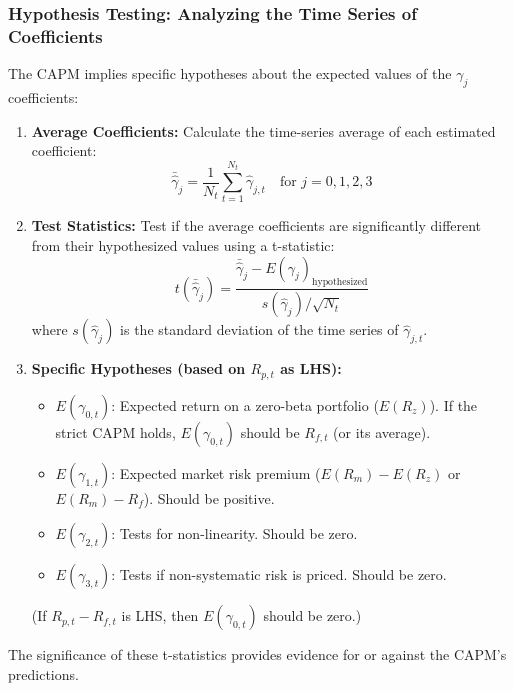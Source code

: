 \documentclass[10pt]{beamer}
\begin{document}
\begin{frame}[allowframebreaks]
  \frametitle{Hypothesis Testing: Analyzing the Time Series of Coefficients}
  The CAPM implies specific hypotheses about the expected values of the $\gamma_j$ coefficients:

  \begin{enumerate}
    \item \textbf{Average Coefficients:} Calculate the time-series average of each estimated coefficient:
          \[ \bar{\hat{\gamma}}_j = \frac{1}{N_t} \sum_{t=1}^{N_t} \hat{\gamma}_{j,t} \quad \text{for } j = 0, 1, 2, 3 \]

    \item \textbf{Test Statistics:} Test if the average coefficients are significantly different from their hypothesized values using a t-statistic:
          \[ t(\bar{\hat{\gamma}}_j) = \frac{\bar{\hat{\gamma}}_j - E(\gamma_j)_{\text{hypothesized}}}{s(\hat{\gamma}_j) / \sqrt{N_t}} \]
          where $s(\hat{\gamma}_j)$ is the standard deviation of the time series of $\hat{\gamma}_{j,t}$.

    \item \textbf{Specific Hypotheses (based on $R_{p,t}$ as LHS):}
      \begin{itemize}
        \item $E(\gamma_{0,t})$: Expected return on a zero-beta portfolio ($E(R_z)$). If the strict CAPM holds, $E(\gamma_{0,t})$ should be $R_{f,t}$ (or its average).
        \item $E(\gamma_{1,t})$: Expected market risk premium ($E(R_m) - E(R_z)$ or $E(R_m) - R_f$). Should be positive.
        \item $E(\gamma_{2,t})$: Tests for non-linearity. Should be zero.
        \item $E(\gamma_{3,t})$: Tests if non-systematic risk is priced. Should be zero.
      \end{itemize}
      (If $R_{p,t} - R_{f,t}$ is LHS, then $E(\gamma_{0,t})$ should be zero.)
  \end{enumerate}
  The significance of these t-statistics provides evidence for or against the CAPM's predictions.
\end{frame}
\end{document}

